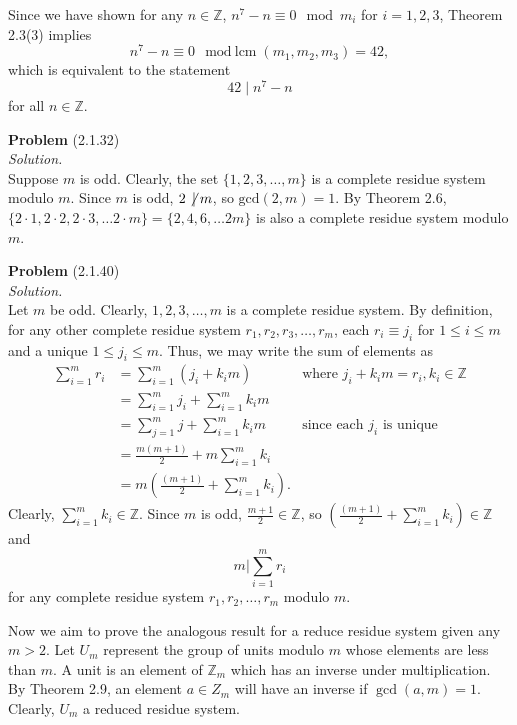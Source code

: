 \documentclass[12 pt]{amsart}
\begin{document}
  Since we have shown 
  for any $n \in \mathbb{Z}$,
  $n^7 - n \equiv 0 \mod m_i$ for $i = 1,2,3$, 
  Theorem 2.3(3) implies
  \[
  n^7 - n \equiv 0 \mod \text{lcm}(m_1, m_2, m_3) = 42, 
  \]
  which is equivalent to the statement 
  \[
    42 \mid n^7 - n
  \]
  for all $n \in \mathbb{Z}$.
\vfill
\newpage



\phantom{\quad} \vfill
\noindent
\textbf{Problem} (2.1.32) \\[4ex]
\emph{Solution.} \\[2ex]
  Suppose $m$ is odd.
  Clearly, the set 
  $\{ 1, 2, 3, \ldots, m\}$ is a complete
  residue system modulo $m$.
  Since $m$ is odd, $2 \not \, \mid m$, so
  $\text{gcd}(2, m) = 1$. 
  By Theorem 2.6, 
  $\{2 \cdot 1, 2 \cdot 2, 2 \cdot 3, \ldots 2 \cdot m \}
  = \{ 2, 4, 6, \ldots 2m\}$ is also a complete residue
  system modulo $m$.
\vfill
\newpage



\phantom{\quad} \vfill
\noindent
\textbf{Problem} (2.1.40) \\[4ex]
\emph{Solution.} \\[2ex]
  Let $m$ be odd.
  Clearly, $1, 2, 3, \ldots, m$ is a complete residue system.
  By definition, for any other complete residue system
  $r_1, r_2, r_3, \ldots, r_m$, each $r_i \equiv j_i$ for
  $1 \leq i \leq m$ and a unique $1 \leq j_i \leq m$.
  Thus, we may write the sum of elements as
  \begin{align*}
    \sum_{i = 1}^m r_i 
    &=
    \sum_{i = 1}^m (j_i + k_i m) & \text{where $j_i + k_i m = r_i, k_i \in \mathbb{Z}$} \\
    &=
      \sum_{i = 1}^m j_i +  \sum_{i = 1}^m k_i m  \\
    &=
      \sum_{j = 1}^m j +  \sum_{i = 1}^m k_i m  & \text{since each $j_i$ is unique}\\
    &=
      \frac{m(m+1)}{2} +  m \sum_{i = 1}^m k_i \\
    &=
      m \left( \frac{(m+1)}{2} +   \sum_{i = 1}^m k_i \right).
  \end{align*}
  Clearly, $\sum_{i = 1}^m k_i \in \mathbb{Z}$.
  Since $m$ is odd, $\frac{m+1}{2} \in \mathbb{Z}$, so 
  $\left( \frac{(m+1)}{2} +   \sum_{i = 1}^m k_i \right) \in \mathbb{Z}$ and 
  \[
    m \mathbin{\Big|} \sum_{i = 1}^m r_i
  \]
  for any complete residue system $r_1, r_2, \ldots, r_m$
  modulo $m$.

  Now we aim to prove the analogous result for a reduce residue system
  given any $m > 2$. 
  Let $U_m$ represent the group of units modulo $m$ whose elements are
  less than $m$. 
  A unit is an element of $\mathbb{Z}_m$ which has an inverse
  under multiplication. 
  By Theorem 2.9, an element $a \in Z_m$ will have an inverse 
  if $\gcd(a, m) = 1$.
  Clearly, $U_m$ a reduced residue system.
\end{document}
